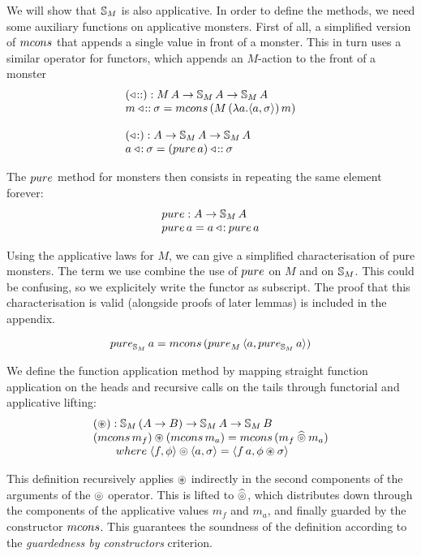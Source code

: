 We will show that $\mathbb{S}_{M}$ is also applicative.
In order to define the methods, we need some auxiliary functions on applicative monsters.
First of all, a simplified version of $\mcons$ that appends a single value in front of a monster.
This in turn uses a similar operator for functors, which appends an $M$-action to the front of a monster
$$
\begin{array}{l}
(\fcons): M\,A \rightarrow \stream{M}\,A \rightarrow \stream{M}\,A\\
m \fcons \sigma = \mcons\, (M\,(\lambda a. \langle a, \sigma\rangle)\,m)\\
\,\\
(\acons): A \rightarrow \stream{M}\,A \rightarrow \stream{M}\,A\\
a \acons \sigma = (\apure\, a) \fcons \sigma
\end{array}
$$

The $\apure$ method for monsters then consists in repeating the same element forever:
$$
\begin{array}{l}
\apure : A \rightarrow \stream{M}\,A\\
\apure\,a = a \acons \apure\,a
\end{array}
$$ 

Using the applicative laws for $M$, we can give a simplified characterisation of pure monsters.
The term we use combine the use of $\apure$ on $M$ and on $\mathbb{S}_{M}$.
This could be confusing, so we explicitely write the functor as subscript. The proof that this characterisation is valid (alongside proofs of later lemmas) is included in the appendix.
\begin{lemma}\label{lemma:monster_pure} 
$$
\apure_{\stream{M}}\,a = \mcons\,(\apure_M\,\langle a, \apure_{\stream{M}}\,a\rangle)
$$
\end{lemma}

We define the function application method by mapping straight function application on the heads and recursive calls on the tails through functorial and applicative lifting:
$$
\begin{array}{l}
(\appl) : \stream{M}\,(A\rightarrow B) \rightarrow \stream{M}\,A \rightarrow \stream{M}\,B\\
(\mcons\,m_f) \appl (\mcons\,m_a)
= \mcons\,(m_f \alift{\pappl} m_a)\\
\qquad \where\;
\langle f,\phi\rangle \pappl \langle a,\sigma\rangle 
= \langle f\,a, \phi \appl \sigma \rangle
\end{array}
$$

This definition recursively applies $\circledast$ indirectly in the second components of the arguments of the $\circledcirc$ operator.
This is lifted to $\mathbin{\widehat{\circledcirc}}$, which distributes down through the components of the applicative values $m_f$ and $m_a$, and finally guarded by the constructor $\mcons$.
This guarantees the soundness of the definition according to the {\em guardedness by constructors} criterion.

